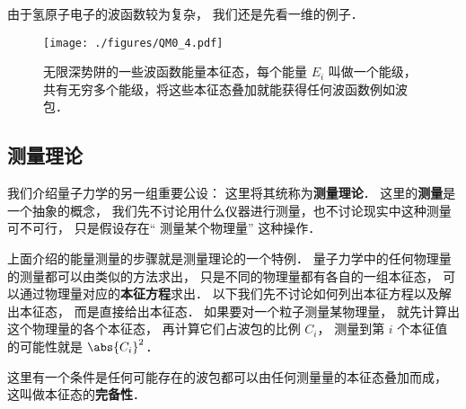 由于氢原子电子的波函数较为复杂， 我们还是先看一维的例子．


\begin{figure}[ht]
\centering
\texttt{[image: ./figures/QM0\_4.pdf]}
\caption{无限深势阱的一些波函数能量本征态，每个能量 $E_i$ 叫做一个能级，共有无穷多个能级，将这些本征态叠加就能获得任何波函数例如波包．} \label{QM0_fig4}
\end{figure}


\subsection{测量理论}
我们介绍量子力学的另一组重要公设： 这里将其统称为\textbf{测量理论}． 这里的\textbf{测量}是一个抽象的概念， 我们先不讨论用什么仪器进行测量，也不讨论现实中这种测量可不可行， 只是假设存在“ 测量某个物理量” 这种操作．

上面介绍的能量测量的步骤就是测量理论的一个特例． 量子力学中的任何物理量的测量都可以由类似的方法求出， 只是不同的物理量都有各自的一组本征态， 可以通过物理量对应的\textbf{本征方程}求出． 以下我们先不讨论如何列出本征方程以及解出本征态， 而是直接给出本征态． 如果要对一个粒子测量某物理量， 就先计算出这个物理量的各个本征态， 再计算它们占波包的比例 $C_i$， 测量到第 $i$ 个本征值的可能性就是 $\abs{C_i}^2$．

这里有一个条件是任何可能存在的波包都可以由任何测量量的本征态叠加而成， 这叫做本征态的\textbf{完备性}．

